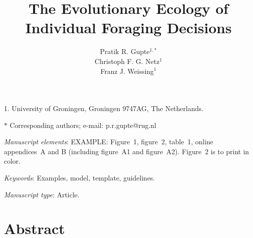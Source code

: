 \documentclass[11pt]{article}
\title{The Evolutionary Ecology of Individual Foraging Decisions}
\author{Pratik R. Gupte$^{1,\ast}$ \\ 
        Christoph F. G. Netz$^{1}$ \\ 
        Franz J. Weissing$^{1}$}
\date{}
\begin{document}
\maketitle

\noindent{} 1. University of Groningen, Groningen 9747AG, The Netherlands.

\noindent{} $\ast$ Corresponding authors; e-mail: p.r.gupte@rug.nl

\bigskip

\textit{Manuscript elements}: EXAMPLE: Figure~1, figure~2, table~1, online appendices~A and B (including figure~A1 and figure~A2). Figure~2 is to print in color.

\bigskip

\textit{Keywords}: Examples, model, template, guidelines.

\bigskip

\textit{Manuscript type}: Article. %

\bigskip


\linenumbers{}
\modulolinenumbers[1]

\newpage{}

\section*{Abstract}

\end{document}
